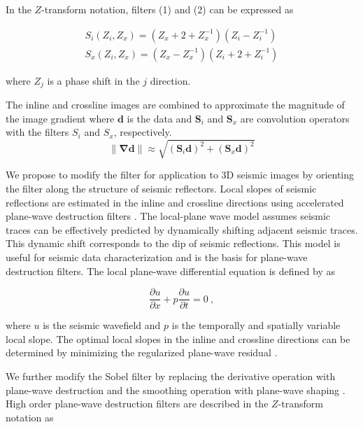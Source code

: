 In the $Z$-transform notation, filters (1) and (2) can be expressed as

\begin{equation}
\begin{array}{l}
S_i(Z_i,Z_x)=(Z_x+2+Z_x^{-1})(Z_i-Z_i^{-1}) \\
S_x(Z_i,Z_x)=(Z_x-Z_x^{-1})(Z_i+2+Z_i^{-1})
\end{array}
\end{equation}

where $Z_j$ is a phase shift in the $j$ direction.

The inline and crossline images are combined to approximate the magnitude of the image gradient \cite[]{chopra07} where $\mathbf{d}$ is the data and $\mathbf{S}_i$ and $\mathbf{S}_x$ are convolution operators with the filters $S_i$ and $S_x$, respectively.
\begin{equation}
\|\mathbf{\nabla}\mathbf{d}\|\approx \sqrt{(\mathbf{S}_i\mathbf{d})^2+(\mathbf{S}_x\mathbf{d})^2}
\end{equation}

We propose to modify the filter for application to 3D seismic images by orienting the filter along the structure of seismic reflectors.
Local slopes of seismic reflections are estimated in the inline and crossline directions using accelerated plane-wave destruction filters \cite[]{apwd}.
The local-plane	wave model assumes seismic traces can be effectively predicted by dynamically shifting adjacent seismic traces.
This dynamic shift corresponds to the dip of seismic reflections.
This model is useful for seismic data characterization and is the basis for plane-wave destruction filters.
The local plane-wave differential equation is defined by \cite{claerbout} as

\begin{equation}
\frac{\partial u}{\partial x}+p\frac{\partial u}{\partial t} = 0 \ ,
\end{equation}

where $u$ is the seismic wavefield and $p$ is the temporally and spatially variable local slope.
The optimal local slopes in the inline	and crossline directions can be determined by minimizing the regularized plane-wave residual \cite[]{fomel02,apwd}.

We further modify the Sobel filter by replacing the derivative operation with plane-wave destruction \cite[]{fomel02} and the smoothing operation with plane-wave shaping \cite[]{fomel07,swindeman}.
High order plane-wave destruction filters are described in the $Z$-transform notation as

